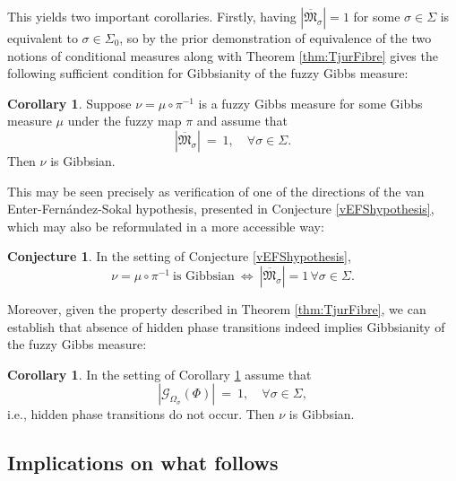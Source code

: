 \documentclass[12pt]{article}
\newcommand{\G}{\mathcal{G}}
\newcommand{\MM}{\mathfrak{M}}
\newcommand{\1}{\mathbbm{1}}
\newcommand{\5}{\vspace{0.5cm}}
\theoremstyle{definition}
\newtheorem{cor}[thm]{Corollary}
\newtheorem{conj}[thm]{Conjecture}
\begin{document}
This yields two important corollaries. Firstly, having $|\overline{\MM}_\sigma|=1$ for some $\sigma\in\Sigma$ is equivalent to $\sigma\in\Sigma_0$, so by the prior demonstration of equivalence of the two notions of conditional measures along with Theorem \ref{thm:TjurFibre} gives the following sufficient condition for Gibbsianity of the fuzzy Gibbs measure:
\begin{cor}\label{vEFSprovendirection}
Suppose $\nu=\mu\circ\pi^{-1}$ is a fuzzy Gibbs measure for some Gibbs measure $\mu$ under the fuzzy map $\pi$ and assume that 
$$|\overline{\MM}_\sigma| ~=~ 1, \quad \forall \sigma\in\Sigma.$$
Then $\nu$ is Gibbsian.
\end{cor}

This may be seen precisely as verification of one of the directions of the van Enter-Fern\'andez-Sokal hypothesis, presented in Conjecture \ref{vEFShypothesis}, which may also be reformulated in a more accessible way:
\begin{conj}\label{vEFShypothesis2}
In the setting of Conjecture \ref{vEFShypothesis},
$$\nu=\mu\circ\pi^{-1}~\text{is Gibbsian}~\iff~|\overline{\MM}_\sigma|=1\,\forall \sigma\in\Sigma.$$
\end{conj}

Moreover, given the property described in Theorem \ref{thm:TjurFibre}, we can establish that absence of hidden phase transitions indeed implies Gibbsianity of the fuzzy Gibbs measure:
\begin{cor}\label{Berghout}
In the setting of Corollary \ref{vEFSprovendirection} assume that 
$$|\G_{\Omega_\sigma}(\Phi)| ~=~ 1, \quad \forall \sigma\in\Sigma,$$
i.e., hidden phase transitions do not occur. Then $\nu$ is Gibbsian.
\end{cor}


\subsection{Implications on what follows}
\end{document}
